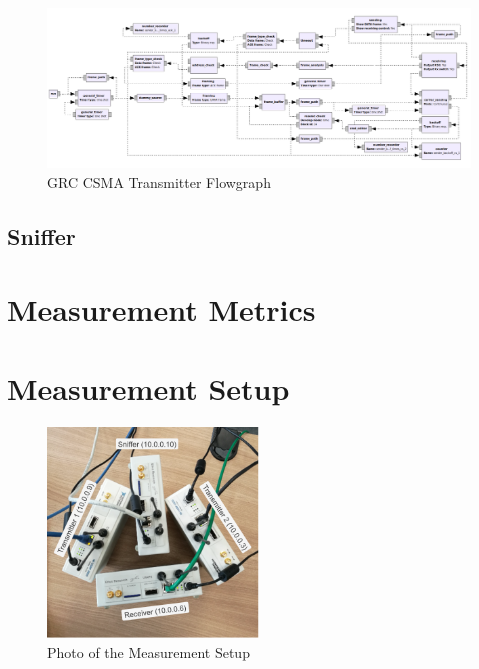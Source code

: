 \begin{figure}
	\label{fig:grc-csma-sender}
	\begin{center}
		\includegraphics[width=\textwidth]{pictures/grc_csma_transmitter_flowgraph}
\end{center}
\caption{GRC CSMA Transmitter Flowgraph}
\end{figure}

\subsection{Sniffer}

\section{Measurement Metrics}

\section{Measurement Setup}

\begin{figure}[ht]
	\label{fig:measurement-setup}
	\begin{center}
		\includegraphics[width=0.5\textwidth]{pictures/measurement_setup}
	\end{center}
	\caption{Photo of the Measurement Setup}
\end{figure}

